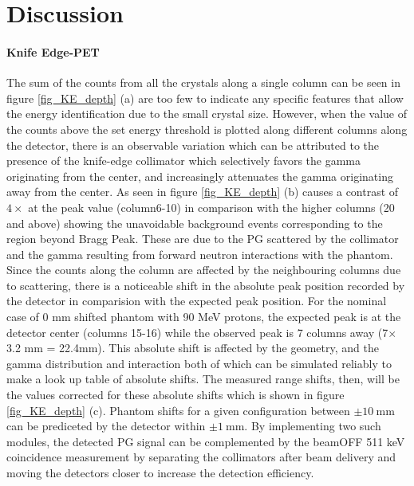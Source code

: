 \documentclass[11pt,a4paper]{article}
\begin{document}
\section{Discussion \label{Discussion}} \label{section_Discussion}

\paragraph{Knife Edge-PET}
The sum of the counts from all the crystals along a single column can be seen in figure \ref{fig_KE_depth} (a) are too few to indicate any specific features that allow the energy identification due to the small crystal size. However, when the value of the counts above the set energy threshold is plotted along different columns along the detector, there is an observable variation which can be attributed to the presence of  the knife-edge collimator which selectively favors the gamma originating from the center, and increasingly attenuates the gamma originating away from the center. As seen in figure \ref{fig_KE_depth} (b) causes a contrast of $\mathrm{4\times}$ at the peak value (column6-10) in comparison with the higher columns (20 and above) showing the unavoidable background events corresponding to the region beyond Bragg Peak.  These are due to the PG scattered by the collimator and the gamma resulting from forward neutron interactions with the phantom. Since the counts along the column are affected by the neighbouring columns due to scattering, there is a noticeable shift in the absolute peak position recorded by the detector in comparision with the expected peak position. For the nominal case of 0 mm shifted phantom with 90 MeV protons, the expected peak is at the detector center (columns 15-16) while the observed peak is 7 columns away (7$\times$3.2 mm = 22.4mm). This absolute shift is affected by the geometry, and the gamma distribution and interaction both of which can be simulated reliably to make a look up table of absolute shifts. The measured range shifts, then, will be the values corrected for these absolute shifts which is shown in figure \ref{fig_KE_depth} (c).  Phantom shifts for a given configuration between $\mathrm{\pm 10\ mm}$ can be prediceted by the detector within $\mathrm{\pm 1\ mm}$.  By implementing two such modules,  the detected PG signal can be complemented by the beamOFF 511 keV coincidence measurement by separating the collimators after beam delivery and moving the detectors closer to increase the detection efficiency. 
\end{document}
